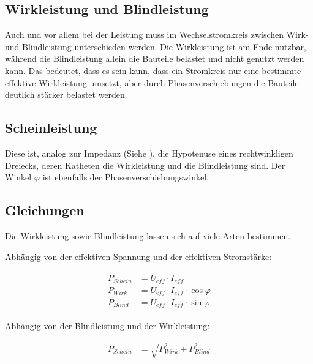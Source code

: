 \subsection{Wirkleistung und Blindleistung}

Auch und vor allem bei der Leistung muss im Wechselstromkreis zwischen Wirk- und Blindleistung unterschieden werden. Die Wirkleistung ist am Ende nutzbar, während die Blindleistung allein die Bauteile belastet und nicht genutzt werden kann. Das bedeutet, dass es sein kann, dass ein Stromkreis nur eine bestimmte effektive Wirkleistung umsetzt, aber durch Phasenverschiebungen die Bauteile deutlich stärker belastet werden.


\subsection{Scheinleistung}

Diese ist, analog zur Impedanz (Siehe ), die Hypotenuse eines rechtwinkligen Dreiecks, deren Katheten die Wirkleistung und die Blindleistung sind. Der Winkel $\varphi$ ist ebenfalls der Phasenverschiebungswinkel.


\subsection{Gleichungen}

Die Wirkleistung sowie Blindleistung lassen sich auf viele Arten bestimmen.

\noindent Abhängig von der effektiven Spannung und der effektiven Stromstärke:

\begin{align}		\label{eq:ScheinleistungUI}
\begin{split}
	P_{Schein} &= U_{eff} \cdot I_{eff}						\\
	P_{Wirk}   &= U_{eff} \cdot I_{eff} \cdot \cos \varphi	\\
	P_{Blind}  &= U_{eff} \cdot I_{eff} \cdot \sin \varphi	
\end{split}
\end{align}

\noindent Abhängig von der Blindleistung und der Wirkleistung:

\begin{align}		\label{eq:ScheinleistungPP}
	P_{Schein}  &= \sqrt{P_{Wirk}^2 + P_{Blind}^2}
\end{align}




